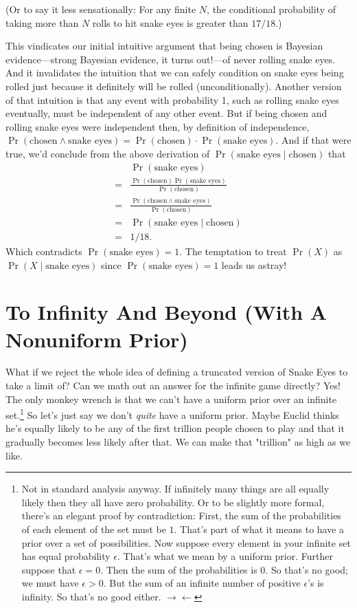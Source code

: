 \documentclass[article,twocolumn]{memoir}
\begin{document}
(Or to say it less sensationally: 
For any finite $N$, the conditional probability of taking more than $N$ rolls to hit snake eyes is greater than $17/18$.)

This vindicates our initial intuitive argument that being chosen is Bayesian evidence---strong Bayesian evidence, it turns out!---of never rolling snake eyes.
And it invalidates the intuition that we can safely condition on snake eyes being rolled just because it definitely will be rolled (unconditionally).
Another version of that intuition is that any event with probability 1, such as rolling snake eyes eventually, must be independent of any other event.
But if being chosen and rolling snake eyes were independent then, by definition of independence,
$\Pr(\text{chosen} \land \text{snake eyes}) = \Pr(\text{chosen})\cdot\Pr(\text{snake eyes})$.
And if that were true, we'd conclude from the above derivation of $\Pr(\text{snake eyes}\mid\text{chosen})$ that
\begin{align*}
   & \Pr(\text{snake eyes})\\
 = & \frac{\Pr(\text{chosen})\Pr(\text{snake eyes})}{\Pr(\text{chosen})}\\
 = & \frac{\Pr(\text{chosen} \land \text{snake eyes})}{\Pr(\text{chosen})}\\
 = & \Pr(\text{snake eyes}\mid\text{chosen})\\
 = & 1/18.
\end{align*}
Which contradicts $\Pr(\text{snake eyes}) = 1$.
The temptation to treat $\Pr(X)$ as $\Pr(X\mid\text{snake eyes})$ since $\Pr(\text{snake eyes}) = 1$ leads us astray!

\chapter{To Infinity And Beyond (With A Nonuniform Prior)}

What if we reject the whole idea of defining a truncated version of Snake Eyes to take a limit of?
Can we math out an answer for the infinite game directly?
Yes!
The only monkey wrench is that we can't have a uniform prior over an infinite set.\footnote{
Not in standard analysis anyway.
If infinitely many things are all equally likely then they all have zero probability.
Or to be slightly more formal, there's an elegant proof by contradiction:
First, the sum of the probabilities of each element of the set must be $1$.
That's part of what it means to have a prior over a set of possibilities.
Now suppose every element in your infinite set has equal probability $\epsilon$.
That's what we mean by a uniform prior.
Further suppose that $\epsilon=0$.
Then the sum of the probabilities is $0$.
So that's no good; we must have $\epsilon>0$.
But the sum of an infinite number of positive $\epsilon$'s is infinity.
So that's no good either.
$\rightarrow\leftarrow$
}
So let's just say we don't \emph{quite} have a uniform prior.
Maybe Euclid thinks he's equally likely to be any of the first trillion people chosen to play and that it gradually becomes less likely after that.
We can make that "trillion" as high as we like.
\end{document}
